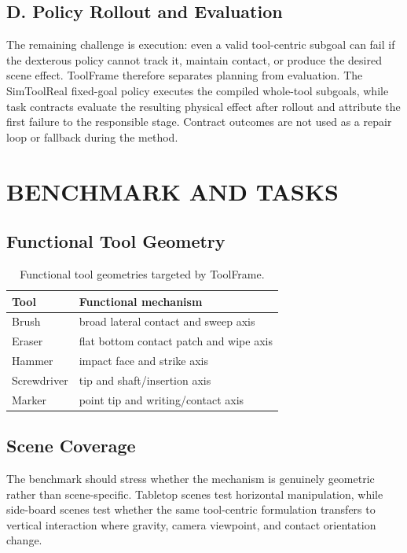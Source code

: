 \documentclass[letterpaper, 10 pt, conference]{ieeeconf}
\newcommand{\method}{ToolFrame}
\begin{document}
\subsection{D. Policy Rollout and Evaluation}
The remaining challenge is execution: even a valid tool-centric subgoal can
fail if the dexterous policy cannot track it, maintain contact, or produce the
desired scene effect. \method{} therefore separates planning from evaluation.
The SimToolReal fixed-goal policy executes the compiled whole-tool subgoals,
while task contracts evaluate the resulting physical effect after rollout and
attribute the first failure to the responsible stage. Contract outcomes are not
used as a repair loop or fallback during the method.

\section{BENCHMARK AND TASKS}

\subsection{Functional Tool Geometry}
\begin{table}[t]
\caption{Functional tool geometries targeted by \method{}.}
\label{tab:tools}
\begin{center}
\begin{tabular}{ll}
\toprule
Tool & Functional mechanism \\
\midrule
Brush & broad lateral contact and sweep axis \\
Eraser & flat bottom contact patch and wipe axis \\
Hammer & impact face and strike axis \\
Screwdriver & tip and shaft/insertion axis \\
Marker & point tip and writing/contact axis \\
\bottomrule
\end{tabular}
\end{center}
\end{table}

\subsection{Scene Coverage}
The benchmark should stress whether the mechanism is genuinely geometric rather
than scene-specific. Tabletop scenes test horizontal manipulation, while
side-board scenes test whether the same tool-centric formulation transfers to
vertical interaction where gravity, camera viewpoint, and contact orientation
change.
\end{document}

